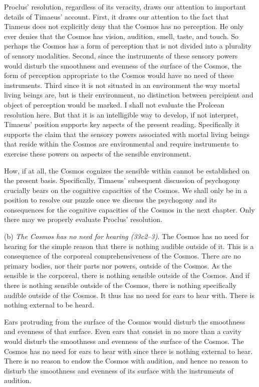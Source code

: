 Proclus' resolution, regardless of its veracity, draws our attention to important details of Timaeus' account. First, it draws our attention to the fact that Tiameus does not explicitly deny that the Cosmos has no perception. He only ever denies that the Cosmos has vision, audition, smell, taste, and touch. So perhaps the Cosmos has a form of perception that is not divided into a plurality of sensory modalities. Second, since the instruments of these sensory powers would disturb the smoothness and evenness of the surface of the Cosmos, the form of perception appropriate to the Cosmos would have no need of these instruments. Third since it is not situated in an environment the way mortal living beings are, but is their environment, no distinction between percipient and object of perception would be marked. I shall not evaluate the Prolcean resolution here. But that it is an intelligible way to develop, if not interpret, Timaeus' position supports key aspects of the present reading. Specifically it supports the claim that the sensory powers associated with mortal living beings that reside within the Cosmos are environmental and require instruments to exercise these powers on aspects of the sensible environment.

How, if at all, the Cosmos cognizes the sensible within cannot be established on the present basis. Specifically, Timaeus' subsequent discussion of psychogony crucially bears on the cognitive capacities of the Cosmos. We shall only be in a position to resolve our puzzle once we discuss the psychogony and its consequences for the cognitive capacities of the Cosmos in the next chapter. Only there may we properly evaluate Proclus' resolution.

(b) \emph{The Cosmos has no need for hearing (33c2–3)}. The Cosmos has no need for hearing for the simple reason that there is nothing audible outside of it. This is a consequence of the corporeal comprehensiveness of the Cosmos. There are no primary bodies, nor their parts nor powers, outside of the Cosmos. As the sensible is the corporeal, there is nothing sensible outside of the Cosmos. And if there is nothing sensible outside of the Cosmos, there is nothing specifically audible outside of the Cosmos. It thus has no need for ears to hear with. There is nothing external to be heard.

Ears protruding from the surface of the Cosmos would disturb the smoothness and evenness of that surface. Even ears that consist in no more than a cavity would disturb the smoothness and evenness of the surface of the Cosmos. The Cosmos has no need for ears to hear with since there is nothing external to hear. There is no reason to endow the Cosmos with audition, and hence no reason to disturb the smoothness and evenness of its surface with the instruments of audition.

